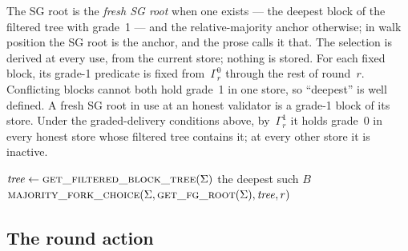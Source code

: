 \documentclass{article}
\theoremstyle{plain}
\theoremstyle{definition}
\theoremstyle{remark}
\newcommand{\fname}[1]{\text{\textsc{#1}}}
\begin{document}
The SG root is the \emph{fresh SG root} when one exists --- the deepest
block of the filtered tree with grade~1 ---
and the relative-majority anchor otherwise; in walk position the SG
root is the anchor, and the prose calls it that.  The selection is derived
at every use, from the current store; nothing is stored.  For each fixed
block, its grade-1 predicate is fixed from~$\Gamma_r^0$ through the rest
of round~$r$.
Conflicting blocks cannot both hold grade~1 in one store, so ``deepest''
is well defined.  A fresh SG root in use at an honest validator is a
grade-1 block of its store.  Under the graded-delivery
conditions above, by~$\Gamma_r^1$ it holds grade~0 in every honest store
whose filtered tree contains it; at every other store it is inactive.

\label{alg:fresh-anchor}
\nopagebreak
{\footnotesize
\begin{algorithmic}[1]
  \State $\mathit{tree}\gets\Call{get\_filtered\_block\_tree}{\Sigma}$
    \State \Return the deepest such $B$
  \EndIf
  \State \Return $\Call{majority\_fork\_choice}{\Sigma,
    \fname{get\_fg\_root}(\Sigma),\mathit{tree},r}$
\EndFunction
\end{algorithmic}
}

\subsection{The round action}\label{sec:healing-action}
\end{document}
